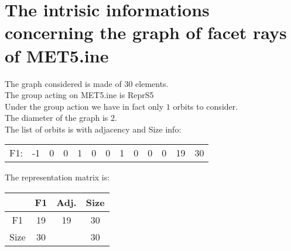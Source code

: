 \documentclass[12pt]{article}
\begin{document}
\section{The intrisic informations concerning the graph of facet rays of MET5.ine}
The graph considered is made of $30$ elements.\\
The group acting on MET5.ine is ReprS5\\
Under the group action we have in fact only $1$ orbits to consider.\\
The diameter of the graph is $2$.\\
The list of orbits is with adjacency and Size info:
\begin{center}
\scriptsize
\begin{tabular}{ccccccccccc|c|c}
F1:&-1&0&0&1&0&0&1&0&0&0&19&30\\
\end{tabular}
\end{center}
The representation matrix is:
\begin{center}
\scriptsize
\begin{tabular}{|c|c|c|c|}
\hline
&F1&Adj.&Size\\
\hline
F1& 19&19&30\\
\hline
Size&30&&30\\
\hline
\end{tabular}
\end{center}
\end{document}
